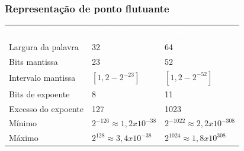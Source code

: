\documentclass[aspectratio=169,
				xcolor=table]{beamer}
\begin{document}
		\begin{frame}
			\frametitle{Representação de ponto flutuante }
			\begin{eftable}
				\begin{tabular}{l | l | l}
					\textcolor{white}{Característica} &
					\textcolor{white}{Único/Curto} &
					\textcolor{white}{Duplo/Longo} \\
					Largura da palavra & 32 & 64 \\
					Bits mantissa & 23 & 52 \\
					Intervalo mantissa & $[1, 2-2^{-23}]$ & $[1, 2-2^{-52}]$\\
					Bits de expoente & 8 & 11 \\
					Excesso do expoente & 127 & 1023 \\
					Mínimo & $2^{-126} \approx 1,2x10^{-38}$ & $2^{-1022}\approx 2,2x10^{-308}$ \\
					Máximo & $2^{128} \approx 3,4x10^{-38}$ & $2^{1024}\approx 1,8x10^{308}$
				\end{tabular}
			
			\end{eftable}
		\end{frame}
\end{document}
